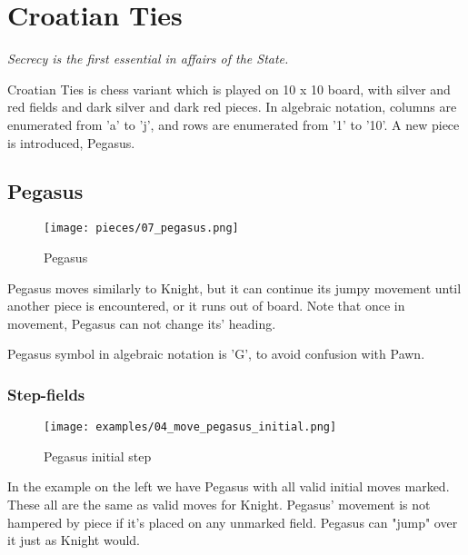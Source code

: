 
\chapter*{Croatian Ties}

\begin{flushright}
\parbox{0.7\textwidth}{
\emph{Secrecy is the first essential in affairs of the State. \\
 } }
\end{flushright}

\noindent
Croatian Ties is chess variant which is played on 10 x 10 board,
with silver and red fields and dark silver and dark red pieces.
In algebraic notation, columns are enumerated from 'a' to 'j',
and rows are enumerated from '1' to '10'. A new piece is
introduced, Pegasus.

\clearpage %

\section*{Pegasus}

\noindent
\begin{wrapfigure}[9]{l}{0.4\textwidth}
\texttt{[image: pieces/07\_pegasus.png]}
\caption{Pegasus}
\label{fig:pegasus}
\end{wrapfigure}
Pegasus moves similarly to Knight, but it can continue its jumpy movement
until another piece is encountered, or it runs out of board. Note that once
in movement, Pegasus can not change its' heading.

Pegasus symbol in algebraic notation is 'G', to avoid confusion with Pawn.

\vspace{2\baselineskip}
\subsection*{Step-fields}

\noindent
\begin{wrapfigure}[15]{l}{0.5\textwidth}
\texttt{[image: examples/04\_move\_pegasus\_initial.png]}
\caption{Pegasus initial step}
\label{fig:pegasus_initial_step}
\end{wrapfigure}
In the example on the left we have Pegasus with all valid initial moves marked.
These all are the same as valid moves for Knight. Pegasus' movement is not hampered
by piece if it's placed on any unmarked field. Pegasus can "jump" over it just as
Knight would.

